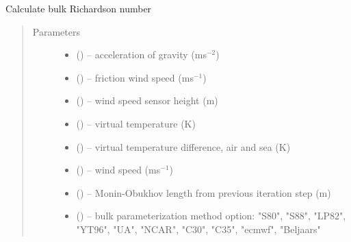 \documentclass[letterpaper,10pt,english]{sphinxmanual}
\begin{document}
\begin{fulllineitems}
\label{\detokenize{index:flux_subs.get_Rb}}
Calculate bulk Richardson number

\begin{quote}\begin{description}
\item[{Parameters}] \leavevmode
\begin{itemize}
\item {} 
(\href{https://docs.python.org/3/library/functions.html\#float}{}) -- acceleration of gravity (ms$^{-2}$)

\item {} 
(\href{https://docs.python.org/3/library/functions.html\#float}{}) -- friction wind speed (ms$^{-1}$)

\item {} 
(\href{https://docs.python.org/3/library/functions.html\#float}{}) -- wind speed sensor height (m)

\item {} 
(\href{https://docs.python.org/3/library/functions.html\#float}{}) -- virtual temperature (K)

\item {} 
(\href{https://docs.python.org/3/library/functions.html\#float}{}) -- virtual temperature difference, air and sea (K)

\item {} 
(\href{https://docs.python.org/3/library/functions.html\#float}{}) -- wind speed (ms$^{-1}$)

\item {} 
(\href{https://docs.python.org/3/library/functions.html\#float}{}) -- Monin-Obukhov length from previous iteration step (m)

\item {} 
(\href{https://docs.python.org/3/library/functions.html\#str}{}) -- bulk parameterization method option: "S80", "S88", "LP82", "YT96", "UA", "NCAR", "C30", "C35", "ecmwf", "Beljaars"
\end{itemize}


\end{description}
\end{quote}
\end{fulllineitems}
\end{document}
